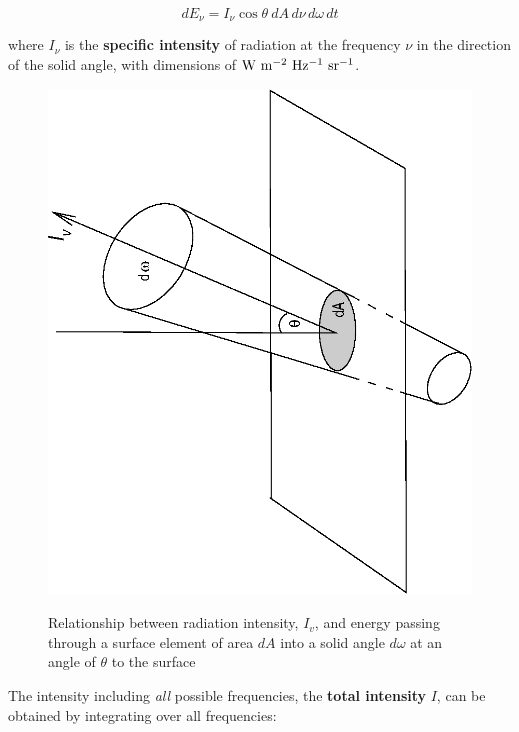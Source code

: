 \documentclass[twoside,11pt]{article}
\begin{document}
\begin{equation}
dE_{\nu} = I_{\nu} \cos \theta\: dA\, d\nu\, d\omega\, dt
\end{equation} 

where $I_\nu$ is the {\bf specific intensity} of radiation at the
frequency $\nu$ in the direction of the solid angle, with dimensions
of ${\rm W~m^{-2}~Hz^{-1}~sr^{-1}}$. 

\begin{figure}[htbp]
   \centering 
   \includegraphics[totalheight=5in,angle=270]{sc6_intensity.ps}
   \begin{quote}
   \caption{Relationship between radiation intensity, $I_v$, and energy
    passing through a surface element of area $dA$ into a solid angle
    $d\omega$ at an angle of $\theta$ to the surface
   \label{INTENSITY} }
   \end{quote}
\end{figure}

The intensity including {\it all} possible frequencies, the {\bf total
intensity} $I$, can be obtained by integrating over all frequencies:
\end{document}
